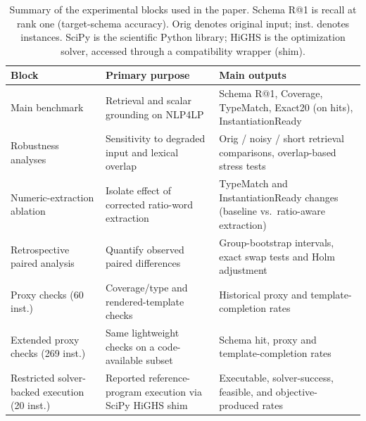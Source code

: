 \documentclass[pdflatex,sn-basic,Numbered]{sn-jnl}
\begin{document}
\begin{table}[htbp]
\centering
\caption{Summary of the experimental blocks used in the paper. Schema R@1 is recall at rank one (target-schema accuracy). Orig denotes original input; inst. denotes instances. SciPy is the scientific Python library; HiGHS is the optimization solver, accessed through a compatibility wrapper (shim).}
\label{tab:exp_blocks}
\small
\begin{tabularx}{\linewidth}{X X X}
\toprule
Block & Primary purpose & Main outputs \\
\midrule
Main benchmark & Retrieval and scalar grounding on \textsc{NLP4LP} & Schema R@1, Coverage, TypeMatch, Exact20 (on hits), InstantiationReady \\
Robustness analyses & Sensitivity to degraded input and lexical overlap & Orig / noisy / short retrieval comparisons, overlap-based stress tests \\
Numeric-extraction ablation & Isolate effect of corrected ratio-word extraction & TypeMatch and InstantiationReady changes (baseline vs.\ ratio-aware extraction) \\
Retrospective paired analysis & Quantify observed paired differences & Group-bootstrap intervals, exact swap tests and Holm adjustment \\
Proxy checks (60 inst.) & Coverage/type and rendered-template checks & Historical proxy and template-completion rates \\
Extended proxy checks (269 inst.) & Same lightweight checks on a code-available subset & Schema hit, proxy and template-completion rates \\
Restricted solver-backed execution (20 inst.) & Reported reference-program execution via SciPy HiGHS shim & Executable, solver-success, feasible, and objective-produced rates \\
\bottomrule
\end{tabularx}
\end{table}
\FloatBarrier

\end{document}
